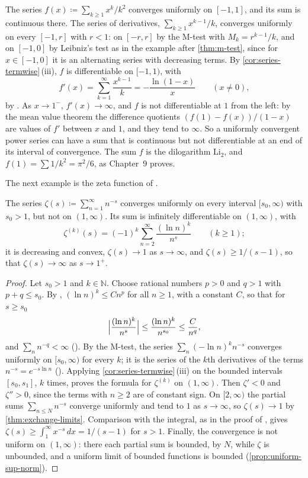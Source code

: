 The series $f(x)\coloneqq\sum_{k\ge1}x^k/k^2$ converges uniformly on $[-1,1]$, and its sum is continuous there. The series of derivatives, $\sum_{k\ge1}x^{k-1}/k$, converges uniformly on every $[-1,r]$ with $r<1$: on $[-r,r]$ by the M-test with $M_k=r^{k-1}/k$, and on $[-1,0]$ by Leibniz's test as in the example after \cref{thm:m-test}, since for $x\in[-1,0]$ it is an alternating series with decreasing terms. By \cref{cor:series-termwise}\,(iii), $f$ is differentiable on $[-1,1)$, with
\[
f'(x)=\sum_{k=1}^\infty\frac{x^{k-1}}k=-\frac{\ln(1-x)}x\qquad(x\ne0),
\]
by . As $x\to1^-$, $f'(x)\to\infty$, and $f$ is not differentiable at $1$ from the left: by the mean value theorem the difference quotients $(f(1)-f(x))/(1-x)$ are values of $f'$ between $x$ and $1$, and they tend to $\infty$. So a uniformly convergent power series can have a sum that is continuous but not differentiable at an end of its interval of convergence. The sum $f$ is the dilogarithm $\mathrm{Li}_2$, and $f(1)=\sum1/k^2=\pi^2/6$, as Chapter~9 proves.

The next example is the zeta function of .

\begin{proposition}
\label{prop:zeta-smooth}
The series $\zeta(s)\coloneqq\sum_{n=1}^\infty n^{-s}$ converges uniformly on every interval $[s_0,\infty)$ with $s_0>1$, but not on $(1,\infty)$. Its sum is infinitely differentiable on $(1,\infty)$, with
\[
\zeta^{(k)}(s)=(-1)^k\sum_{n=2}^\infty\frac{(\ln n)^k}{n^s}\qquad(k\ge1);
\]
it is decreasing and convex, $\zeta(s)\to1$ as $s\to\infty$, and $\zeta(s)\ge1/(s-1)$, so that $\zeta(s)\to\infty$ as $s\to1^+$.
\end{proposition}

\begin{proof}
Let $s_0>1$ and $k\in\mathbb N$. Choose rational numbers $p>0$ and $q>1$ with $p+q\le s_0$. By , $(\ln n)^k\le Cn^p$ for all $n\ge1$, with a constant $C$, so that for $s\ge s_0$
\[
\Bigl|\frac{(\ln n)^k}{n^s}\Bigr|\le\frac{(\ln n)^k}{n^{s_0}}\le\frac C{n^{q}},
\]
and $\sum_nn^{-q}<\infty$ (). By the M-test, the series $\sum_n(-\ln n)^kn^{-s}$ converges uniformly on $[s_0,\infty)$ for every $k$; it is the series of the $k$th derivatives of the terms $n^{-s}=e^{-s\ln n}$ (). Applying \cref{cor:series-termwise}\,(iii) on the bounded intervals $[s_0,s_1]$, $k$ times, proves the formula for $\zeta^{(k)}$ on $(1,\infty)$. Then $\zeta'<0$ and $\zeta''>0$, since the terms with $n\ge2$ are of constant sign. On $[2,\infty)$ the partial sums $\sum_{n\le N}n^{-s}$ converge uniformly and tend to $1$ as $s\to\infty$, so $\zeta(s)\to1$ by \cref{thm:exchange-limits}. Comparison with the integral, as in the proof of , gives $\zeta(s)\ge\int_1^\infty x^{-s}\,dx=1/(s-1)$ for $s>1$. Finally, the convergence is not uniform on $(1,\infty)$: there each partial sum is bounded, by $N$, while $\zeta$ is unbounded, and a uniform limit of bounded functions is bounded (\cref{prop:uniform-sup-norm}).
\end{proof}

